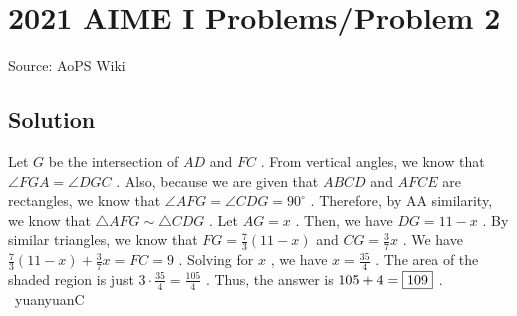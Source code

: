 \documentclass[12pt]{article}
\begin{document}
\section*{{2021 AIME I Problems/Problem 2}}
Source: AoPS Wiki

\subsection*{Solution}
Let $G$ be the intersection of $AD$ and $FC$ .
From vertical angles, we know that $\angle FGA= \angle DGC$ . Also, because we are given that $ABCD$ and $AFCE$ are rectangles, we know that $\angle AFG= \angle CDG=90 ^{\circ}$ .
Therefore, by AA similarity, we know that $\triangle AFG\sim\triangle CDG$ . Let $AG=x$ . Then, we have $DG=11-x$ . By similar triangles, we know that $FG=\frac{7}{3}(11-x)$ and $CG=\frac{3}{7}x$ . We have $\frac{7}{3}(11-x)+\frac{3}{7}x=FC=9$ . Solving for $x$ , we have $x=\frac{35}{4}$ .
The area of the shaded region is just $3\cdot \frac{35}{4}=\frac{105}{4}$ . Thus, the answer is $105+4=\framebox{109}$ . ~yuanyuanC
\end{document}
